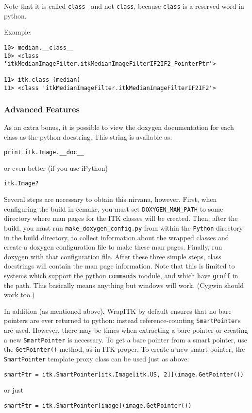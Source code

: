 \documentclass{InsightArticle}
\begin{document}
\begin{itemize}
Note that it is called \verb$class_$ and not \verb$class$, because \verb$class$ is a
reserved word in python.

Example:
\begin{verbatim}
10> median.__class__
10> <class 'itkMedianImageFilter.itkMedianImageFilterIF2IF2_PointerPtr'>

11> itk.class_(median)
11> <class 'itkMedianImageFilter.itkMedianImageFilterIF2IF2'>
\end{verbatim}


\end{itemize}

     \subsubsection{Advanced Features}

As an extra bonus, it is possible to view the doxygen documentation for each
class as the python docstring. This string is available as:
\small \begin{verbatim}
print itk.Image.__doc__
\end{verbatim} \normalsize
or even better (if you use iPython)
\small \begin{verbatim}
itk.Image?
\end{verbatim} \normalsize

Several steps are necessary to obtain this nirvana, however. First, when
configuring the build in ccmake, you must set \verb$DOXYGEN_MAN_PATH$ to some directory
where man pages for the ITK classes will be created. Then, after the build, you
must run \verb$make_doxygen_config.py$ from within the \verb$Python$ directory in the build
directory, to collect information about the wrapped classes and create a doxygen
configuration file to make these man pages. Finally, run doxygen with that
configuration file. After these three simple steps, class docstrings will
contain the man page information. Note that this is limited to systems which
support the python \verb$commands$ module, and which have \verb$groff$ in the path. This
basically means anything but windows will work. (Cygwin should work too.)

In addition (as mentioned above), WrapITK by default ensures that no bare
pointers are ever returned to python: instead reference-counting \verb$SmartPointer$s
are used. However, there may be times when extracting a bare pointer or creating
a new \verb$SmartPointer$ is necessary. To get a bare pointer from a smart pointer, use
the \verb$GetPointer()$ method, as in ITK proper. To create a new smart pointer, the
\verb$SmartPointer$ template proxy class can be used just as above:
\small \begin{verbatim}
smartPtr = itk.SmartPointer[itk.Image[itk.US, 2]](image.GetPointer())
\end{verbatim} \normalsize
or just
\small \begin{verbatim}
smartPtr = itk.SmartPointer[image](image.GetPointer())
\end{verbatim} \normalsize
\end{document}
